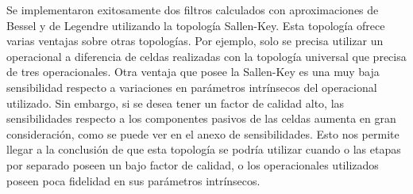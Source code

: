 Se implementaron exitosamente dos filtros calculados con aproximaciones de Bessel y de Legendre utilizando la topología Sallen-Key. Esta topología ofrece varias ventajas sobre otras topologías. Por ejemplo, solo se precisa utilizar un operacional a diferencia de celdas realizadas con la topología universal que precisa de tres operacionales. Otra ventaja que posee la Sallen-Key es una muy baja sensibilidad respecto a variaciones en parámetros intrínsecos del operacional utilizado. Sin embargo, si se desea tener un factor de calidad alto, las sensibilidades respecto a los componentes pasivos de las celdas aumenta en gran consideración, como se puede ver en el anexo de sensibilidades. Esto nos permite llegar a la conclusión de que esta topología se podría utilizar cuando o las etapas por separado poseen un bajo factor de calidad, o los operacionales utilizados poseen poca fidelidad en sus parámetros intrínsecos.

